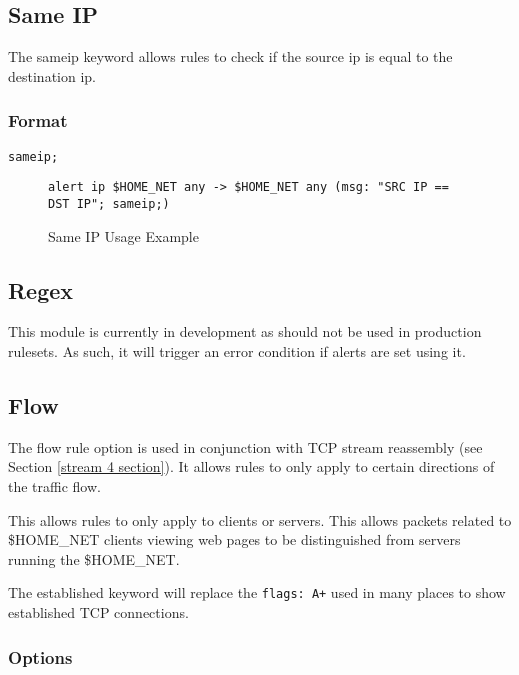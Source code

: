 \documentclass[english]{report}
\begin{document}
\subsection{Same IP}

The sameip keyword allows rules to check if the source ip is equal
to the destination ip. 


\subsubsection{Format}

\begin{verbatim}
sameip;
\end{verbatim}
%
\begin{figure}[!hbpt]
\begin{verbatim}
alert ip $HOME_NET any -> $HOME_NET any (msg: "SRC IP == DST IP"; sameip;)
\end{verbatim}

\caption{Same IP Usage Example\label{sameip usage example}}
\end{figure}

\subsection{Regex}

This module is currently in development as should not be used in production
rulesets.  As such, it will trigger an error condition if alerts are set using it.

\subsection{Flow\label{flow section}}

The flow rule option is used in conjunction with TCP stream reassembly
(see Section \ref{stream 4 section}). It allows rules to only apply
to certain directions of the traffic flow. 

This allows rules to only apply to clients or servers. This allows
packets related to \$HOME\_NET clients viewing web pages to be distinguished
from servers running the \$HOME\_NET.

The established keyword will replace the \texttt{flags: A+} used in
many places to show established TCP connections.

\subsubsection*{Options}
\end{document}
